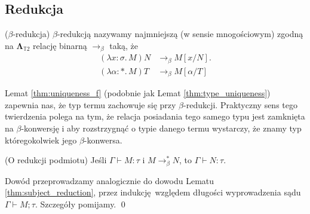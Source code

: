   \subsection{Redukcja}

  \begin{definicja}(\(\beta\)-redukcja)
    \(\beta\)-redukcją nazywamy najmniejszą (w sensie mnogościowym) zgodną na \(\mathbf{\Lambda}_{\mathbb{T}2}\) relację binarną \(\to_\beta\) taką, że
  \begin{align*}
    (\lambda x:\sigma.\,M)N &\to_\beta M[x/N].\\
    (\lambda \alpha:*.\,M) T &\to_\beta M[\alpha/T]
  \end{align*}
  \end{definicja}

Lemat \ref{thm:uniqueness_f} (podobnie jak Lemat \ref{thm:type_uniqueness}) zapewnia nas, że typ termu zachowuje się przy \(\beta\)-redukcji. Praktyczny sens tego twierdzenia polega na tym, że relacja posiadania tego samego typu jest zamknięta na \(\beta\)-konwersję i aby rozstrzygnąć o typie danego termu wystarczy, że znamy typ któregokolwiek jego \(\beta\)-konwersa.

\begin{lemat}(O redukcji podmiotu)\label{thm:uniqueness_f}
  Jeśli \(\Gamma\vdash M:\tau\) i \(M\to^{*}_\beta N\), to \(\Gamma\vdash N:\tau\).
\end{lemat}
\begin{dowod}
  Dowód przeprowadzamy analogicznie do dowodu Lematu \ref{thm:subject_reduction}, przez indukcję względem długości wyprowadzenia sądu \(\Gamma\vdash M;\tau\). Szczegóły pomijamy. \qed
\end{dowod}


